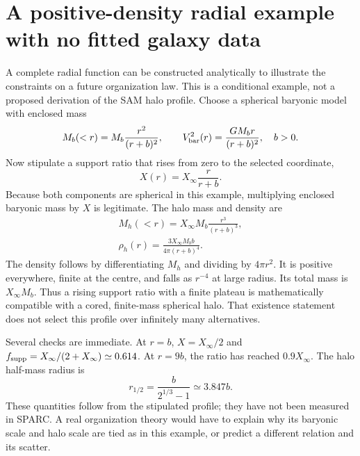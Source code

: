 \section{A positive-density radial example with no fitted galaxy data}

A complete radial function can be constructed analytically to illustrate the constraints on a future organization law. This is a conditional example, not a proposed derivation of the SAM halo profile. Choose a spherical baryonic model with enclosed mass
\begin{equation}
 M_b(<r)=M_b\frac{r^2}{(r+b)^2},\qquad
 V_{\rm bar}^2(r)=\frac{GM_br}{(r+b)^2},\quad b>0.
 \label{c10:toybaryons}
\end{equation}
Now stipulate a support ratio that rises from zero to the selected coordinate,
\begin{equation}
 X(r)=X_\infty\frac{r}{r+b}.
 \label{c10:toyx}
\end{equation}
Because both components are spherical in this example, multiplying enclosed baryonic mass by $X$ is legitimate. The halo mass and density are
\begin{equation}
 \begin{gathered}
 M_h(<r)=X_\infty M_b\frac{r^3}{(r+b)^3},\\
 \rho_h(r)=\frac{3X_\infty M_bb}{4\pi(r+b)^4}.
 \end{gathered}
 \label{c10:toydensity}
\end{equation}
The density follows by differentiating $M_h$ and dividing by $4\pi r^2$. It is positive everywhere, finite at the centre, and falls as $r^{-4}$ at large radius. Its total mass is $X_\infty M_b$. Thus a rising support ratio with a finite plateau is mathematically compatible with a cored, finite-mass spherical halo. That existence statement does not select this profile over infinitely many alternatives.

Several checks are immediate. At $r=b$, $X=X_\infty/2$ and $f_{\rm supp}=X_\infty/(2+X_\infty)\simeq0.614$. At $r=9b$, the ratio has reached $0.9X_\infty$. The halo half-mass radius is
\begin{equation}
 r_{1/2}=\frac{b}{2^{1/3}-1}\simeq3.847b.
 \label{c10:toyhalf}
\end{equation}
These quantities follow from the stipulated profile; they have not been measured in SPARC. A real organization theory would have to explain why its baryonic scale and halo scale are tied as in this example, or predict a different relation and its scatter.

